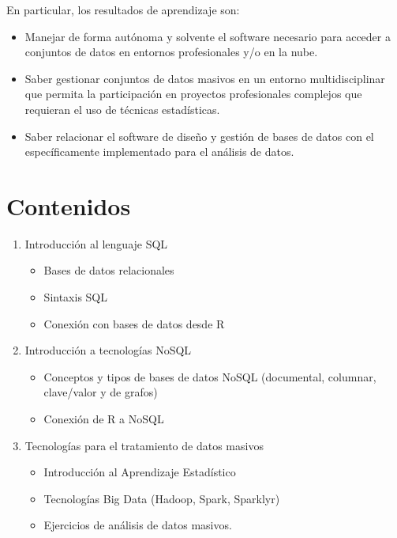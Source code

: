 \documentclass[
]{book}
\providecommand{\tightlist}{%
  \setlength{\itemsep}{0pt}\setlength{\parskip}{0pt}}
\begin{document}
En particular, los resultados de aprendizaje son:

\begin{itemize}
\item
  Manejar de forma autónoma y solvente el software necesario para acceder a conjuntos de datos en entornos profesionales y/o en la nube.
\item
  Saber gestionar conjuntos de datos masivos en un entorno multidisciplinar que permita la participación en proyectos profesionales complejos que requieran el uso de técnicas estadísticas.
\item
  Saber relacionar el software de diseño y gestión de bases de datos con el específicamente implementado para el análisis de datos.
\end{itemize}

\section{Contenidos}\label{contenidos}

\begin{enumerate}
\def\labelenumi{\arabic{enumi}.}
\tightlist
\item
  Introducción al lenguaje SQL

  \begin{itemize}
  \tightlist
  \item
    Bases de datos relacionales
  \item
    Sintaxis SQL
  \item
    Conexión con bases de datos desde R
  \end{itemize}
\item
  Introducción a tecnologías NoSQL

  \begin{itemize}
  \tightlist
  \item
    Conceptos y tipos de bases de datos NoSQL (documental, columnar, clave/valor y de grafos)
  \item
    Conexión de R a NoSQL
  \end{itemize}
\item
  Tecnologías para el tratamiento de datos masivos

  \begin{itemize}
  \tightlist
  \item
    Introducción al Aprendizaje Estadístico
  \item
    Tecnologías Big Data (Hadoop, Spark, Sparklyr)
  \item
    Ejercicios de análisis de datos masivos.
  \end{itemize}
\end{enumerate}
\end{document}
